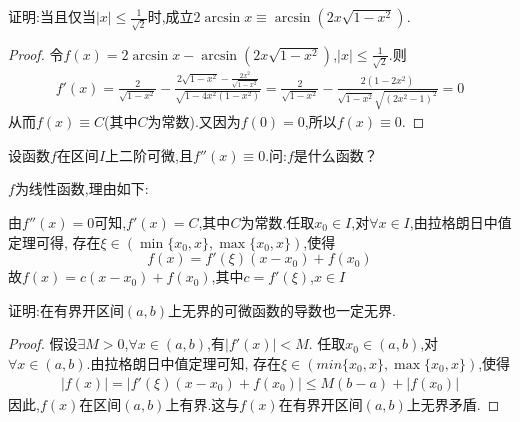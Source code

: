 \documentclass[lang=cn,newtx,10pt,scheme=chinese]{elegantbook}
\begin{document}
\begin{exercise}
    证明:当且仅当\(\vert x\vert\leq\frac{1}{\sqrt{2}}\)时,成立\(2\arcsin x\equiv\arcsin(2x\sqrt{1 - x^{2}})\).
    \begin{proof}
    令$f(x)=2\arcsin x-\arcsin(2x\sqrt{1 - x^{2}})$,\(\vert x\vert\leq\frac{1}{\sqrt{2}}\).则
    \begin{equation}
        \begin{split}
            f'\left( x \right) =\frac{2}{\sqrt{1-x^2}}-\frac{2\sqrt{1-x^2}-\frac{2x^2}{\sqrt{1-x^2}}}{\sqrt{1-4x^2\left( 1-x^2 \right)}}
            =\frac{2}{\sqrt{1-x^2}}-\frac{2\left( 1-2x^2 \right)}{\sqrt{1-x^2}\sqrt{\left( 2x^2-1 \right) ^2}}=0
        \end{split}
      \nonumber
    \end{equation}
    从而$f(x)\equiv C$(其中$C$为常数).又因为$f(0)=0$,所以$f(x)\equiv0$.
    \end{proof}
\end{exercise}

\begin{exercise}
    设函数\(f\)在区间\(I\)上二阶可微,且\(f''(x)\equiv0\).问:$f$是什么函数？
    \begin{solution}
    $f$为线性函数,理由如下:

    由$f''(x)=0$可知,$f'(x)=C$,其中$C$为常数.任取$x_0\in I$,对$\forall x\in I$,由拉格朗日中值定理可得,
    存在$\xi\in(\min\{x_0,x\},\max\{x_0,x\})$,使得
    \begin{equation}
        f(x)=f'(\xi)(x-x_0)+f(x_0)
        \nonumber
    \end{equation}
    故$f(x)=c(x-x_0)+f(x_0)$,其中$c=f'(\xi)$,$x\in I$
    \end{solution}
\end{exercise}

\begin{exercise}
    证明:在有界开区间\((a,b)\)上无界的可微函数的导数也一定无界.
    \begin{proof}
        假设$\exists M>0$,$\forall x\in(a,b)$,有$|f'(x)|<M$.
        任取$x_0\in(a,b)$,对$\forall x\in(a,b)$.由拉格朗日中值定理可知,
        存在$\xi\in(min\{x_0,x\},\max\{x_0,x\})$,使得
        \begin{equation}
            \begin{split}
                |f(x)|=|f'(\xi )(x-x_0)+f(x_0)|\leqslant M\left( b-a \right) +|f(x_0)|
            \end{split}
            \nonumber
        \end{equation}
        因此,$f(x)$在区间$(a,b)$上有界.这与$f(x)$在有界开区间\((a,b)\)上无界矛盾.
    \end{proof}
\end{exercise}
\end{document}
